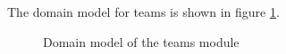 The domain model for teams is shown in figure \ref{fig:teams_domainModel}.

\begin{figure}[htb]
\begin{center}
\end{center}
\caption{ Domain model of the teams module \label{fig:teams_domainModel}}
\end{figure}
